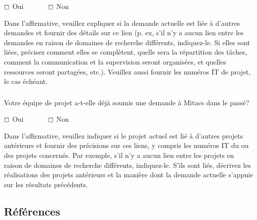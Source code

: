 \documentclass{mitacs-acceleration}
\begin{document}
$\boxempty$ Oui~~~~~~~$\boxempty$ Non

\begin{instructions}
Dans l'affirmative, veuillez expliquer si la demande actuelle est liée à d'autres demandes et fournir des détails sur ce lien (p. ex, s'il n'y a aucun lien entre les demandes en raison de domaines de recherche différents, indiquez-le. Si elles sont liées, précisez comment elles se complètent, quelle sera la répartition des tâches, comment la communication et la supervision seront organisées, et quelles ressources seront partagées, etc.). Veuillez aussi fournir les numéros IT de projet, le cas échéant.
\end{instructions}


\subsubsection{} Votre équipe de projet a-t-elle déjà soumis une demande à Mitacs dans le passé?

$\boxempty$ Oui~~~~~~~$\boxempty$ Non

\begin{instructions}
Dans l'affirmative, veuillez indiquer si le projet actuel est lié à d'autres projets antérieurs et fournir des précisions sur ces liens, y compris les numéros IT du ou des projets concernés. Par exemple, s'il n'y a aucun lien entre les projets en raison de domaines de recherche différents, indiquez-le. S'ils sont liés, décrivez les réalisations des projets antérieurs et la manière dont la demande actuelle s'appuie sur les résultats précédents.
\end{instructions}


\subsection{Références} %





\end{document}
